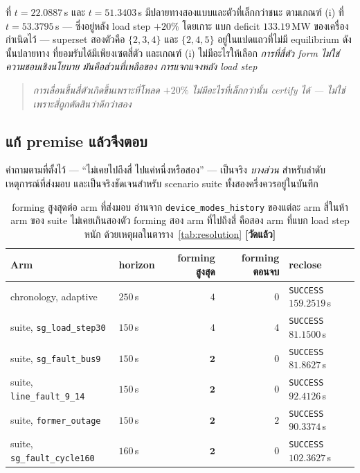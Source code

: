 \documentclass[12pt,a4paper]{article}
\theoremstyle{remark}
\newcommand{\code}[1]{\texttt{\small #1}}
\newcommand{\measured}{\textcolor{ok}{\textbf{[วัดแล้ว]}}}
\begin{document}
ที่ $t = 22.0887$\,s และ $t = 51.3403$\,s มีปลายทางสองแบบและตัวที่เล็กกว่าชนะ
ตามเกณฑ์ (i) ที่ $t = 53.3795$\,s --- ซึ่งอยู่หลัง load step $+20\%$ โดยเกาะ
แบก deficit $133.19$\,MW ของเครื่องกำเนิดไว้ --- superset สองตัวคือ
$\{2,3,4\}$ และ $\{2,4,5\}$ อยู่ในแปดแถวที่ไม่มี equilibrium ดังนั้นปลายทาง
ที่ยอมรับได้มีเพียงเซตสี่ตัว และเกณฑ์ (i) ไม่มีอะไรให้เลือก
\emph{การที่สี่ตัว form ไม่ใช่ความชอบเชิงนโยบาย มันคือส่วนที่เหลือของ
การแจกแจงหลัง load step}

\begin{quote}\itshape
การเลื่อนขึ้นสี่ตัวเกิดขึ้นเพราะที่โหลด $+20\%$ ไม่มีอะไรที่เล็กกว่านั้น
certify ได้ --- ไม่ใช่เพราะสี่ถูกตัดสินว่าดีกว่าสอง
\end{quote}

\subsection{แก้ premise แล้วจึงตอบ}

คำถามตามที่ตั้งไว้ --- ``ไม่เคยไปถึงสี่ ไปแค่หนึ่งหรือสอง'' --- เป็นจริง
\emph{บางส่วน} สำหรับลำดับเหตุการณ์ที่ส่งมอบ และเป็นจริงชัดเจนสำหรับ
scenario suite ทั้งสองครึ่งควรอยู่ในบันทึก

\begin{table}[H]
\centering
\small
\begin{tabular}{@{}llrrl@{}}
\toprule
\textbf{Arm} & \textbf{horizon} & \textbf{forming สูงสุด} & \textbf{forming ตอนจบ} & \textbf{reclose}\\
\midrule
chronology, adaptive      & $250$\,s & $4$ & $0$ & \code{SUCCESS} $159.2519$\,s\\
suite, \code{sg\_load\_step30}  & $150$\,s & $4$ & $4$ & \code{SUCCESS} $81.1500$\,s\\
suite, \code{sg\_fault\_bus9}   & $150$\,s & $\mathbf{2}$ & $0$ & \code{SUCCESS} $81.8627$\,s\\
suite, \code{line\_fault\_9\_14}& $150$\,s & $\mathbf{2}$ & $0$ & \code{SUCCESS} $92.4126$\,s\\
suite, \code{former\_outage}    & $150$\,s & $\mathbf{2}$ & $2$ & \code{SUCCESS} $90.3374$\,s\\
suite, \code{sg\_fault\_cycle160}& $160$\,s & $\mathbf{2}$ & $0$ & \code{SUCCESS} $102.3627$\,s\\
\bottomrule
\end{tabular}
\caption{forming สูงสุดต่อ arm ที่ส่งมอบ อ่านจาก \code{device\_modes\_history}
ของแต่ละ arm สี่ในห้า arm ของ suite ไม่เคยเกินสองตัว forming สอง arm ที่ไปถึงสี่
คือสอง arm ที่แบก load step หนัก ด้วยเหตุผลในตาราง~\ref{tab:resolution} \measured}
\label{tab:arms}
\end{table}
\end{document}
